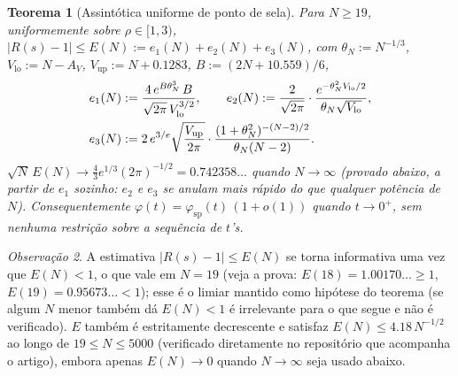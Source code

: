 \documentclass[11pt]{amsart}
\theoremstyle{plain}
\newtheorem{theorem}{Teorema}
\theoremstyle{definition}
\theoremstyle{remark}
\newtheorem{remark}[theorem]{Observação}
\begin{document}
\begin{theorem}[Assintótica uniforme de ponto de sela]
\label{thm:formulaA}
Para $N\ge19$, uniformemente sobre $\rho\in[1,3)$, $|R(s)-1|\le E(N) := e_1(N)+e_2(N)+e_3(N)$, com
$\theta_N := N^{-1/3}$, $V_{\mathrm{lo}} := N-A_V$, $V_{\mathrm{up}} := N+0.1283$,
$B := (2N+10.559)/6$,
\begin{align}
e_1(N) &:= \frac{4\,e^{B\theta_N^3}\,B}{\sqrt{2\pi}\,V_{\mathrm{lo}}^{3/2}}, \qquad
e_2(N) := \frac{2}{\sqrt{2\pi}}\cdot\frac{e^{-\theta_N^2V_{\mathrm{lo}}/2}}{\theta_N\sqrt{V_{\mathrm{lo}}}},
\label{eq:Ebound}\\
e_3(N) &:= 2\,e^{3/e}\sqrt{\frac{V_{\mathrm{up}}}{2\pi}}\cdot
\frac{(1+\theta_N^2)^{-(N-2)/2}}{\theta_N(N-2)}. \notag
\end{align}
$\sqrt N\,E(N) \to \tfrac43e^{1/3}(2\pi)^{-1/2} = 0.742358\ldots$ quando $N\to\infty$
(provado abaixo, a partir de $e_1$ sozinho: $e_2$ e $e_3$ se anulam mais rápido do que qualquer
potência de $N$). Consequentemente $\varphi(t) = \varphi_{\mathrm{sp}}(t)\,(1+o(1))$ quando
$t \to 0^+$, sem nenhuma restrição sobre a sequência de $t$'s.
\end{theorem}

\begin{remark}
A estimativa $|R(s)-1|\le E(N)$ se torna informativa uma vez que $E(N)<1$, o que vale em $N=19$
(veja a prova: $E(18)=1.00170\ldots\ge1$, $E(19)=0.95673\ldots<1$); esse é o limiar mantido como
hipótese do teorema (se algum $N$ menor também dá $E(N)<1$ é irrelevante para o que segue e não é
verificado). $E$ também é estritamente decrescente e satisfaz $E(N)\le4.18\,N^{-1/2}$ ao longo de
$19\le N\le5000$ (verificado diretamente no repositório que acompanha o artigo), embora apenas
$E(N)\to0$ quando $N\to\infty$ seja usado abaixo.
\end{remark}
\end{document}
